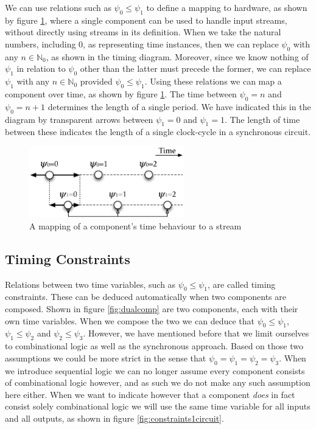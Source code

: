 We can use relations such as $\psi_0 \le \psi_1$ to define a mapping to hardware, as shown by figure \ref{fig:constraintsinglemap}, where a single component can be used to handle input streams, without directly using streams in its definition.
When we take the natural numbers, including 0, as representing time instances, then we can replace $\psi_0$ with any $n \in \mathbb{N}_0$, as shown in the timing diagram.
Moreover, since we know nothing of $\psi_1$ in relation to $\psi_0$ other than the latter must precede the former, we can replace $\psi_1$ with any $n \in \mathbb{N}_0$ provided $\psi_0 \le \psi_1$. 
Using these relations we can map a component over time, as shown by figure \ref{fig:constraintsinglemap}.
The time between $\psi_0=n$ and $\psi_0=n+1$ determines the length of a single period.
We have indicated this in the diagram by transparent arrows between $\psi_1 = 0$ and $\psi_1 = 1$.
The length of time between these indicates the length of a single clock-cycle in a synchronous circuit.

\begin{figure}[h]
\centering
\includegraphics[width=0.6\textwidth]{images/constraintsinglemap}
\caption{A mapping of a component's time behaviour to a stream} 
\label{fig:constraintsinglemap}
\end{figure}

\subsection{Timing Constraints}
Relations between two time variables, such as $\psi_0 \le \psi_1$, are called timing constraints. 
These can be deduced automatically when two components are composed.
Shown in figure \ref{fig:dualcomp} are two components, each with their own time variables.
When we compose the two we can deduce that $\psi_0 \le \psi_1$, $\psi_1 \le \psi_2$ and $\psi_2 \le \psi_3$.
However, we have mentioned before that we limit ourselves to combinational logic as well as the synchronous approach.
Based on those two assumptions we could be more strict in the sense that $\psi_0 = \psi_1 = \psi_2 = \psi_3$.
When we introduce sequential logic we can no longer assume every component consists of combinational logic however, and as such we do not make any such assumption here either.
When we want to indicate however that a component \textit{does} in fact consist solely combinational logic we will use the same time variable for all inputs and all outputs, as shown in figure \ref{fig:constraints1circuit}.

